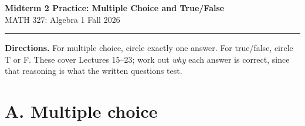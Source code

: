 \documentclass[11pt,letterpaper]{article}
\newif\ifsolutions
\begin{document}
\begin{center}
{\Large\bfseries Midterm 2 Practice: Multiple Choice and True/False\ifsolutions\ --- Solutions\fi}\\[2pt]
MATH 327: Algebra 1 \quad\textbar\quad Fall 2026
\end{center}
\vspace{-5pt}
\hrule
\vspace{5pt}
\textbf{Directions.} For multiple choice, circle exactly one answer. For true/false, circle T or F. These cover Lectures 15--23; work out \emph{why} each answer is correct, since that reasoning is what the written questions test.

\section*{A. Multiple choice}
\end{document}
